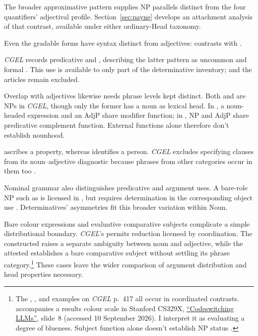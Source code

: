 \documentclass[12pt]{article}
\begin{document}
The broader approximative pattern supplies NP parallels distinct from the four quantifiers' adjectival profile. Section~\ref{sec:payne} develops an attachment analysis of that contrast, available under either ordinary-Head taxonomy.

Even the gradable forms have syntax distinct from adjectives:  contrasts with  \citep[392--396, 431--432, 539--540]{huddleston2002}.

\textit{CGEL} records predicative  and , describing the latter pattern as uncommon and formal \citep[392, 395--396]{huddleston2002}. This use is available to only part of the determinative inventory;  and the articles remain excluded.

Overlap with adjectives likewise needs phrase levels kept distinct. Both  and  are NPs in \textit{CGEL}, though only the former has a noun as lexical head. In , a noun-headed expression and an AdjP share modifier function; in , NP and AdjP share predicative complement function. External functions alone therefore don't establish nounhood.

 ascribes a property, whereas  identifies a person. \textit{CGEL} excludes specifying  clauses from its noun--adjective diagnostic because phrases from other categories occur in them too \citep[536]{huddleston2002}.

Nominal grammar also distinguishes predicative and argument uses. A bare-role NP such as  is licensed in , but requires determination in the corresponding object use  \citep[328]{huddleston2002}. Determinatives' asymmetries fit this broader variation within Noun.

Bare colour expressions and evaluative comparative subjects complicate a simple distributional boundary. \textit{CGEL}'s  permits reduction licensed by coordination. The constructed  raises a separate ambiguity between noun and adjective, while the attested  establishes a bare comparative subject without settling its phrase category.\footnote{The , , and  examples on \textit{CGEL} p.~417 all occur in coordinated contrasts.  accompanies a results colour scale in Stanford CS329X, \href{https://web.stanford.edu/class/cs329x/slides/Lecture12_B_Codeswitching\%20LLMs.pdf}{\enquote{Codeswitching LLMs}}, slide~8 (accessed 10 September 2026). I interpret it as evaluating a degree of blueness. Subject function alone doesn't establish NP status \citep[236]{huddleston2002}.} These cases leave the wider comparison of argument distribution and head properties necessary.
\end{document}
